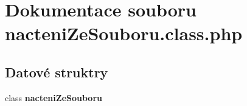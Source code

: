 \section{Dokumentace souboru nacteniZeSouboru.class.php}
\label{nacteniZeSouboru_8class_8php}
\subsection*{Datové struktry}
\begin{CompactItemize}
\item 
class {\bf nacteniZeSouboru}
\end{CompactItemize}
